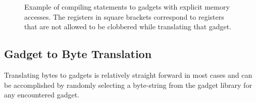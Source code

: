     \begin{figure}
        \centering
        \caption[Example of compiling statements to gadgets with explicit memory
        accesses.]{Example of compiling statements to gadgets with explicit memory
        accesses. The registers in square brackets correspond to registers that
        are not allowed to be clobbered while translating that gadget.}
        \label{fig:method-direct-to-gadget}
    \end{figure}

    \subsection{Gadget to Byte Translation}

    Translating bytes to gadgets is relatively straight forward in most cases
    and can be accomplished by randomly selecting a byte-string from the gadget
    library for any encountered gadget.

